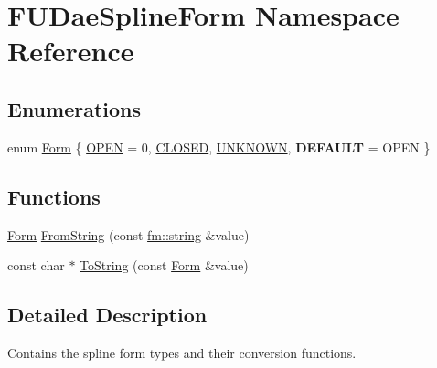 \hypertarget{namespaceFUDaeSplineForm}{
\section{FUDaeSplineForm Namespace Reference}
\label{namespaceFUDaeSplineForm}
}
\subsection*{Enumerations}
\begin{DoxyCompactItemize}
\item 
enum \hyperlink{namespaceFUDaeSplineForm_a03b0ace2ce34dd4e28a14343d6aca88d}{Form} \{ \hyperlink{namespaceFUDaeSplineForm_a03b0ace2ce34dd4e28a14343d6aca88da4448741a6e3b8f04ab4e88c797279cd2}{OPEN} =  0, 
\hyperlink{namespaceFUDaeSplineForm_a03b0ace2ce34dd4e28a14343d6aca88da68c7c6f35e67d39527283dda1a128a98}{CLOSED}, 
\hyperlink{namespaceFUDaeSplineForm_a03b0ace2ce34dd4e28a14343d6aca88da310e325ede25d387212f1b93a187162b}{UNKNOWN}, 
{\bfseries DEFAULT} =  OPEN
 \}
\end{DoxyCompactItemize}
\subsection*{Functions}
\begin{DoxyCompactItemize}
\item 
\hyperlink{namespaceFUDaeSplineForm_a03b0ace2ce34dd4e28a14343d6aca88d}{Form} \hyperlink{namespaceFUDaeSplineForm_a59cb4c618b20513b026e500399f72325}{FromString} (const \hyperlink{classfm_1_1stringT}{fm::string} \&value)
\item 
const char $\ast$ \hyperlink{namespaceFUDaeSplineForm_a301d56021aea16cd40071244f382f776}{ToString} (const \hyperlink{namespaceFUDaeSplineForm_a03b0ace2ce34dd4e28a14343d6aca88d}{Form} \&value)
\end{DoxyCompactItemize}


\subsection{Detailed Description}
Contains the spline form types and their conversion functions. 

